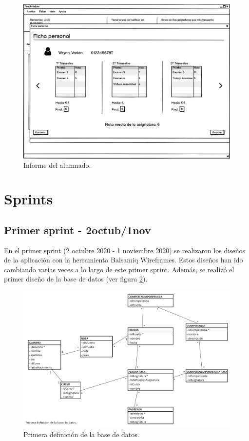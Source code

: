 \begin{figure}[h]
\centering\includegraphics[width=1\linewidth]{figs/mockup_informealumno.png}
\caption{Informe del alumnado.}
\label{Fig:mockup_informealumno}
\end{figure}




\section{Sprints}


\subsection{Primer sprint - 2octub/1nov}

En el primer sprint (2 octubre 2020 - 1 noviembre 2020) se realizaron los diseños de la aplicación con la herramienta Balsamiq Wireframes. Estos diseños han ido cambiando varias veces a lo largo de este primer sprint. Además, se realizó el primer diseño de la base de datos (ver figura \ref{Fig:db_definition1}).

\begin{figure}[h]
\centering\includegraphics[width=1\linewidth]{figs/DB_Definition_1.png}
\caption{Primera definición de la base de datos.}
\label{Fig:db_definition1}
\end{figure}

